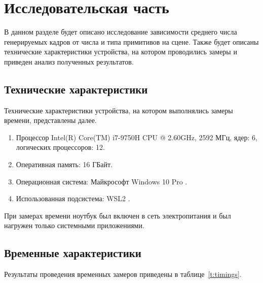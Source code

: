 \chapter{Исследовательская часть}


В данном разделе будет описано исследование зависимости среднего числа генерируемых кадров от числа и типа примитивов на сцене. Также будет описаны технические характеристики устройства, на котором проводились замеры и приведен анализ полученных результатов.

\section{Технические характеристики}

Технические характеристики устройства, на котором выполнялись замеры времени, представлены далее.

\begin{enumerate}
	\item Процессор	Intel(R) Core(TM) i7-9750H CPU @ 2.60GHz, 2592 МГц, ядер: 6, логических процессоров: 12.
	\item Оперативная память: 16 ГБайт.
	\item Операционная система: Майкрософт Windows 10 Pro \cite{windows}.
	\item Использованная подсистема: WSL2 \cite{WSL2}.
\end{enumerate}

При замерах времени ноутбук был включен в сеть электропитания и был нагружен только системными приложениями.

\section{Временные характеристики}
Результаты проведения временных замеров приведены в таблице~\ref{t:timings}.


